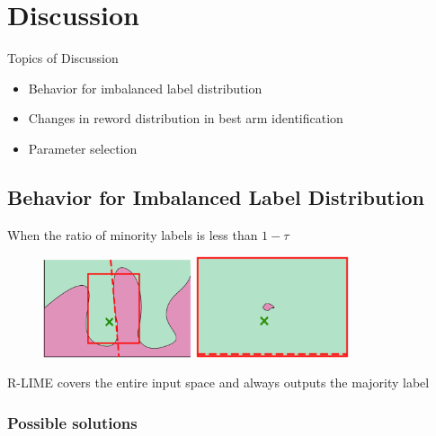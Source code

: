 \documentclass[aspectratio=169]{slide-ja}
\begin{document}
\section{Discussion}

\begin{frame}{}
  Topics of Discussion
  \begin{itemize}
    \item Behavior for imbalanced label distribution
    \item Changes in reword distribution in best arm identification
    \item Parameter selection
  \end{itemize}
\end{frame}

\subsection{Behavior for Imbalanced Label Distribution}

\begin{frame}{}
  When the ratio of minority labels is less than $1-\tau$
  \begin{figure}
    \centering
    \includegraphics[width=0.39\textwidth]{visual-rlime3}
    \hspace{1em}
    \includegraphics[width=0.4\textwidth]{visual-rlime-imbalanced}
  \end{figure}
  R-LIME covers the entire input space and always outputs the majority label
\end{frame}

\subsubsection{Possible solutions}
\end{document}
